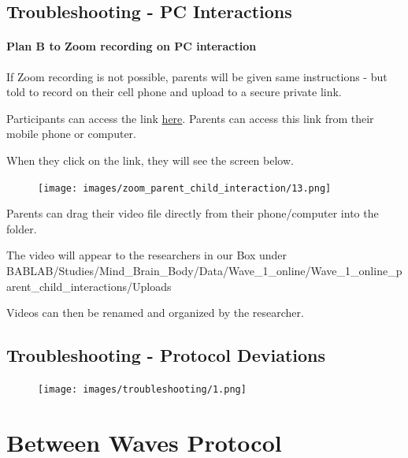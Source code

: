 \documentclass[
]{book}
\begin{document}
\hypertarget{troubleshooting---pc-interactions}{%
\section{Troubleshooting - PC Interactions}\label{troubleshooting---pc-interactions}}

\hypertarget{plan-b-to-zoom-recording-on-pc-interaction}{%
\subsubsection{Plan B to Zoom recording on PC interaction}\label{plan-b-to-zoom-recording-on-pc-interaction}}

If Zoom recording is not possible, parents will be given same instructions - but told to record on their cell phone and upload to a secure private link.

Participants can access the link \href{https://ucla.app.box.com/f/3c52df2afb1a446ab363b793f8af22c1}{here}. Parents can access this link from their mobile phone or computer.

When they click on the link, they will see the screen below.

\begin{figure}
\centering
\texttt{[image: images/zoom\_parent\_child\_interaction/13.png]}
\caption{}
\end{figure}

Parents can drag their video file directly from their phone/computer into the folder.

The video will appear to the researchers in our Box under BABLAB/Studies/Mind\_Brain\_Body/Data/Wave\_1\_online/Wave\_1\_online\_parent\_child\_interactions/Uploads

Videos can then be renamed and organized by the researcher.

\hypertarget{troubleshooting---protocol-deviations}{%
\section{Troubleshooting - Protocol Deviations}\label{troubleshooting---protocol-deviations}}

\begin{figure}
\centering
\texttt{[image: images/troubleshooting/1.png]}
\caption{}
\end{figure}

\hypertarget{between-waves-protocol}{%
\chapter{Between Waves Protocol}\label{between-waves-protocol}}
\end{document}
